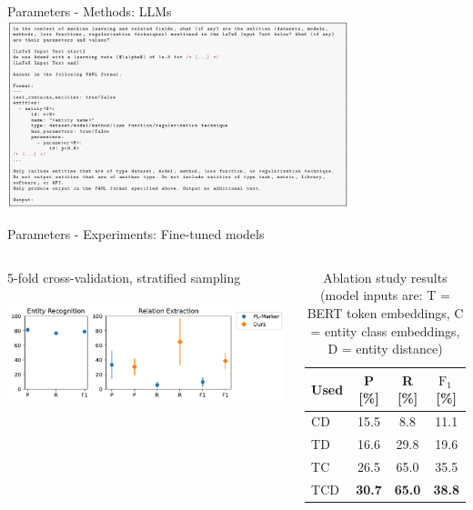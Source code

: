 \documentclass[en,16:9,smallfoot]{sdqbeamer}
\begin{document}
   \begin{frame}{Parameters - Methods: LLMs}
       \centering
       \includegraphics[width=0.75\textwidth]{imgs/prompt}
   \end{frame}

   \begin{frame}{Parameters - Experiments: Fine-tuned models}
   \begin{columns}
          5-fold cross-validation, stratified sampling\\
          ‌\\
           \includegraphics[width=\linewidth]{imgs/fine_tuned_eval}
        \begin{table}
          \centering
          \caption[Ablation study results]{Ablation study results (model inputs are: T = BERT token embeddings, C = entity class embeddings, D = entity distance)}
          \label{tab:finetunedablation}
          \begin{tabular}{lccc}
            \hline
            Used & P [\%] & R [\%] & $\text{F}_1$\,[\%] \\
            \hline
            \textvisiblespace CD & 15.5 & 8.8 & 11.1 \\
            T\textvisiblespace D & 16.6 & 29.8 & 19.6 \\
            TC\textvisiblespace & 26.5 & 65.0 & 35.5 \\
            TCD & \textbf{30.7} & \textbf{65.0} & \textbf{38.8} \\
            \hline
          \end{tabular}
        \end{table}
   \end{columns}
   \end{frame}
\end{document}
